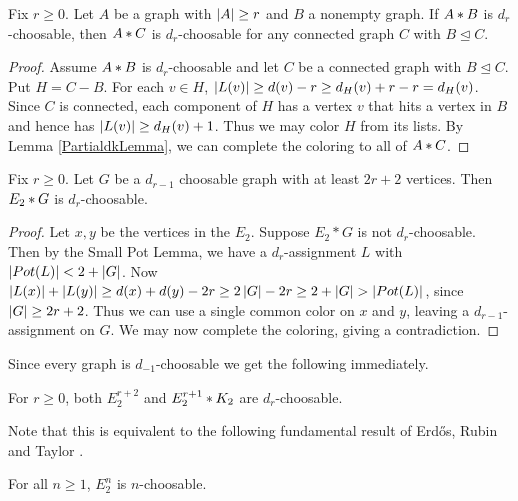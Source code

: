 \begin{lem}\label{ConnectedSubgraphLemma}
Fix $r \geq 0$. Let $A$ be a graph with $\left|A\right| \geq r$ and $B$ a nonempty graph.  If $A \mbox{\hspace{2 pt}$\ast$\hspace{2 pt}} B$ is $d_r$-choosable, then $A \mbox{\hspace{2 pt}$\ast$\hspace{2 pt}} C$ is 
$d_r$-choosable for any connected graph $C$ with $B \unlhd C$.
\end{lem}
\begin{proof}
Assume $A \mbox{\hspace{2 pt}$\ast$\hspace{2 pt}} B$ is $d_r$-choosable and let $C$ be a connected graph with $B \unlhd C$.  Put $H = C - B$.  For each $v \in H$, $\left|L(v)\right| \geq d(v) - r \geq d_H(v) + r - r = d_H(v)$.  Since $C$ is connected, each component of $H$ has a vertex $v$ that hits a vertex in $B$ and hence has $\left|L(v)\right| \geq d_H(v) + 1$. Thus we may color $H$ from its lists.  By 
Lemma \ref{PartialdkLemma}, we can complete the coloring to all of $A \mbox{\hspace{2 pt}$\ast$\hspace{2 pt}} C$.
\end{proof}

\begin{lem}\label{E2bringsdown}
Fix $r \geq 0$.  Let $G$ be a $d_{r - 1}$ choosable graph with at least $2r + 2$ vertices. Then $E_2 \mbox{\hspace{2 pt}$\ast$\hspace{2 pt}} G$ is $d_r$-choosable.
\end{lem}
\begin{proof}
Let $x,y$ be the vertices in the $E_2$.  Suppose $E_2*G$ is not $d_r$-choosable.  Then by the Small Pot Lemma,
we have a $d_r$-assignment $L$ with $\left|Pot(L)\right| < 2 + \left|G\right|$. 
Now $\left|L(x)\right| + \left|L(y)\right| \geq d(x) + d(y) - 2r \geq 2\left|G\right| - 2r \geq 2
+ \left|G\right| > |Pot(L)|$, since $\left|G\right| \geq 2r+2$.  Thus we can use a single common color
on $x$ and $y$, leaving a $d_{r-1}$-assignment on $G$.  We may now complete the coloring, giving a contradiction.
\end{proof}

Since every graph is $d_{-1}$-choosable we get the following immediately.
\begin{cor}\label{E2rJoinK2}
For $r \geq 0$, both $E_2^{r+2}$ and $E_2^{r+1} \mbox{\hspace{2 pt}$\ast$\hspace{2 pt}} K_2$ are $d_r$-choosable.
\end{cor}

Note that this is equivalent to the following fundamental result of Erd\H{o}s, Rubin and Taylor \cite{erdos1979choosability}. 

\begin{lem}\label{E2n}
For all $n \geq 1$, $E_2^n$ is $n$-choosable.
\end{lem}


